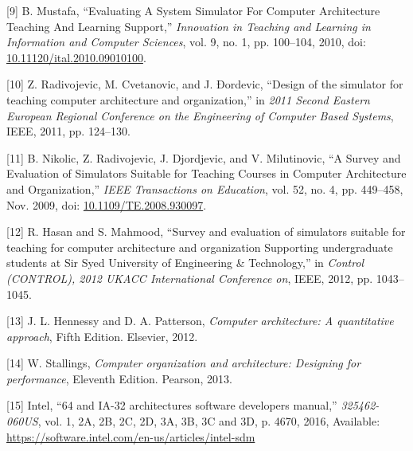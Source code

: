 \documentclass[12pt,oneside]{templates/unerthesis}
\newcommand{\CSLLeftMargin}[1]{#1} %
\newcommand{\CSLRightInline}[1]{#1} %
\newlength{\cslhangindent}
\newenvironment{CSLReferences}[2] %
 {\setlength{\parindent}{0pt}%
  \setlength{\leftskip}{#1 pt\relax}%
  \setlength{\parskip}{#2 pt\relax}%
  \everypar{\setlength{\hangindent}{\cslhangindent}}}
 {\par}
\begin{document}
\begin{CSLReferences}{0}{0}
\leavevmode{}%
\CSLLeftMargin{{[}9{]} }%
\CSLRightInline{B. Mustafa, {``Evaluating {A} {System} {Simulator} {For} {Computer} {Architecture} {Teaching} {And} {Learning} {Support},''} \emph{Innovation in Teaching and Learning in Information and Computer Sciences}, vol. 9, no. 1, pp. 100--104, 2010, doi: \href{https://doi.org/10.11120/ital.2010.09010100}{10.11120/ital.2010.09010100}.}

\leavevmode{}%
\CSLLeftMargin{{[}10{]} }%
\CSLRightInline{Z. Radivojevic, M. Cvetanovic, and J. Ðordevic, {``Design of the simulator for teaching computer architecture and organization,''} in \emph{2011 {Second} {Eastern} {European} {Regional} {Conference} on the {Engineering} of {Computer} {Based} {Systems}}, IEEE, 2011, pp. 124--130.}

\leavevmode{}%
\CSLLeftMargin{{[}11{]} }%
\CSLRightInline{B. Nikolic, Z. Radivojevic, J. Djordjevic, and V. Milutinovic, {``A {Survey} and {Evaluation} of {Simulators} {Suitable} for {Teaching} {Courses} in {Computer} {Architecture} and {Organization},''} \emph{IEEE Transactions on Education}, vol. 52, no. 4, pp. 449--458, Nov. 2009, doi: \href{https://doi.org/10.1109/TE.2008.930097}{10.1109/TE.2008.930097}.}

\leavevmode{}%
\CSLLeftMargin{{[}12{]} }%
\CSLRightInline{R. Hasan and S. Mahmood, {``Survey and evaluation of simulators suitable for teaching for computer architecture and organization {Supporting} undergraduate students at {Sir} {Syed} {University} of {Engineering} \& {Technology},''} in \emph{Control ({CONTROL}), 2012 {UKACC} {International} {Conference} on}, IEEE, 2012, pp. 1043--1045.}

\leavevmode{}%
\CSLLeftMargin{{[}13{]} }%
\CSLRightInline{J. L. Hennessy and D. A. Patterson, \emph{Computer architecture: {A} quantitative approach}, Fifth Edition. Elsevier, 2012.}

\leavevmode{}%
\CSLLeftMargin{{[}14{]} }%
\CSLRightInline{W. Stallings, \emph{Computer organization and architecture: Designing for performance}, Eleventh Edition. Pearson, 2013.}

\leavevmode{}%
\CSLLeftMargin{{[}15{]} }%
\CSLRightInline{Intel, {``64 and {IA}-32 architectures software developers manual,''} \emph{325462-060US}, vol. 1, 2A, 2B, 2C, 2D, 3A, 3B, 3C and 3D, p. 4670, 2016, Available: \url{https://software.intel.com/en-us/articles/intel-sdm}}


\end{CSLReferences}
\end{document}
